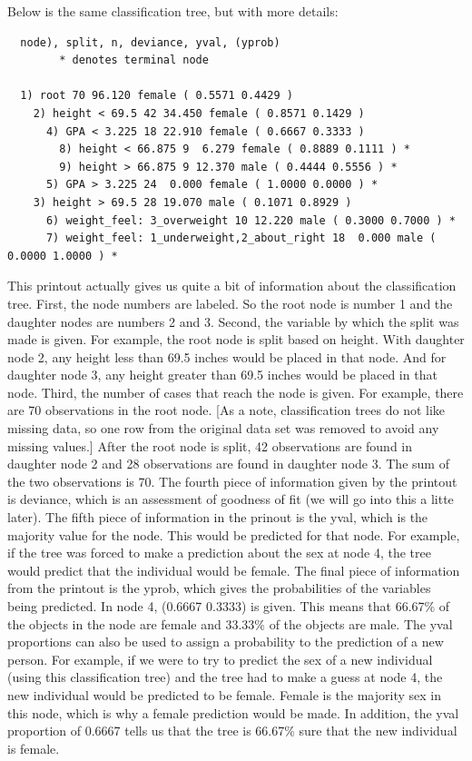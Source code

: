 \documentclass[12pt,twoside]{reedthesis}
\begin{document}
  Below is the same classification tree, but with more details:
  
  \begin{verbatim}
  node), split, n, deviance, yval, (yprob)
        * denotes terminal node
  
  1) root 70 96.120 female ( 0.5571 0.4429 )  
    2) height < 69.5 42 34.450 female ( 0.8571 0.1429 )  
      4) GPA < 3.225 18 22.910 female ( 0.6667 0.3333 )  
        8) height < 66.875 9  6.279 female ( 0.8889 0.1111 ) *
        9) height > 66.875 9 12.370 male ( 0.4444 0.5556 ) *
      5) GPA > 3.225 24  0.000 female ( 1.0000 0.0000 ) *
    3) height > 69.5 28 19.070 male ( 0.1071 0.8929 )  
      6) weight_feel: 3_overweight 10 12.220 male ( 0.3000 0.7000 ) *
      7) weight_feel: 1_underweight,2_about_right 18  0.000 male ( 0.0000 1.0000 ) *
  \end{verbatim}
  
  This printout actually gives us quite a bit of information about the
  classification tree. First, the node numbers are labeled. So the root
  node is number 1 and the daughter nodes are numbers 2 and 3. Second, the
  variable by which the split was made is given. For example, the root
  node is split based on height. With daughter node 2, any height less
  than 69.5 inches would be placed in that node. And for daughter node 3,
  any height greater than 69.5 inches would be placed in that node. Third,
  the number of cases that reach the node is given. For example, there are
  70 observations in the root node. {[}As a note, classification trees do
  not like missing data, so one row from the original data set was removed
  to avoid any missing values.{]} After the root node is split, 42
  observations are found in daughter node 2 and 28 observations are found
  in daughter node 3. The sum of the two observations is 70. The fourth
  piece of information given by the printout is deviance, which is an
  assessment of goodness of fit (we will go into this a litte later). The
  fifth piece of information in the prinout is the yval, which is the
  majority value for the node. This would be predicted for that node. For
  example, if the tree was forced to make a prediction about the sex at
  node 4, the tree would predict that the individual would be female. The
  final piece of information from the printout is the yprob, which gives
  the probabilities of the variables being predicted. In node 4, (0.6667
  0.3333) is given. This means that 66.67\% of the objects in the node are
  female and 33.33\% of the objects are male. The yval proportions can
  also be used to assign a probability to the prediction of a new person.
  For example, if we were to try to predict the sex of a new individual
  (using this classification tree) and the tree had to make a guess at
  node 4, the new individual would be predicted to be female. Female is
  the majority sex in this node, which is why a female prediction would be
  made. In addition, the yval proportion of 0.6667 tells us that the tree
  is 66.67\% sure that the new individual is female.
  
\end{document}
